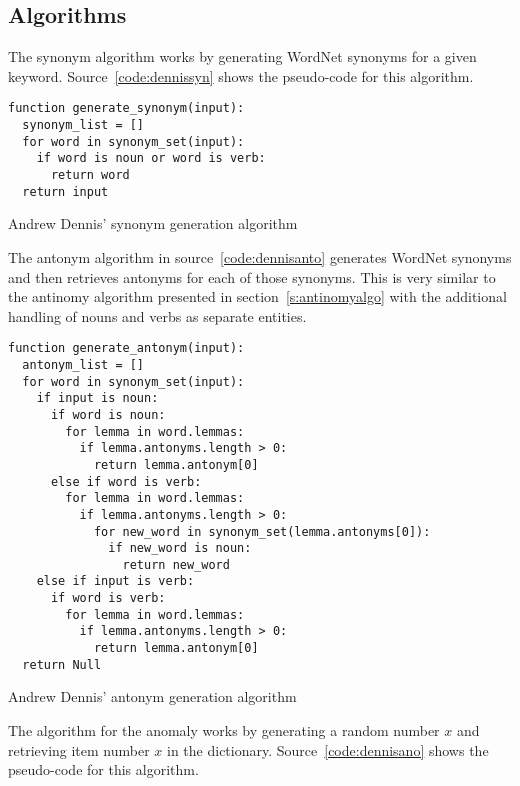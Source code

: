 \subsection{Algorithms}

The synonym algorithm works by generating WordNet synonyms for a given keyword. Source~\ref{code:dennissyn} shows the pseudo-code for this algorithm.

\begin{listing}[!htbp] %
  \begin{verbatim}
function generate_synonym(input):
  synonym_list = []
  for word in synonym_set(input):
    if word is noun or word is verb:
      return word
  return input
  \end{verbatim}
\caption[Dennis' synonym generation]{Andrew Dennis' synonym generation algorithm}
\label{code:dennissyn}
\end{listing}

The antonym algorithm in source~\ref{code:dennisanto} generates WordNet synonyms and then retrieves antonyms for each of those synonyms. This is very similar to the antinomy algorithm presented in section~\ref{s:antinomyalgo} with the additional handling of nouns and verbs as separate entities.

\begin{listing}[!htbp] %
  \begin{verbatim}
function generate_antonym(input):
  antonym_list = []
  for word in synonym_set(input):
    if input is noun:
      if word is noun:
        for lemma in word.lemmas:
          if lemma.antonyms.length > 0:
            return lemma.antonym[0]
      else if word is verb:
        for lemma in word.lemmas:
          if lemma.antonyms.length > 0:
            for new_word in synonym_set(lemma.antonyms[0]):
              if new_word is noun:
                return new_word
    else if input is verb:
      if word is verb:
        for lemma in word.lemmas:
          if lemma.antonyms.length > 0:
            return lemma.antonym[0]
  return Null
  \end{verbatim}
\caption[Dennis' antonym generation]{Andrew Dennis' antonym generation algorithm}
\label{code:dennisanto}
\end{listing}

The algorithm for the anomaly works by generating a random number $x$ and retrieving item number $x$ in the dictionary. Source~\ref{code:dennisano} shows the pseudo-code for this algorithm.

